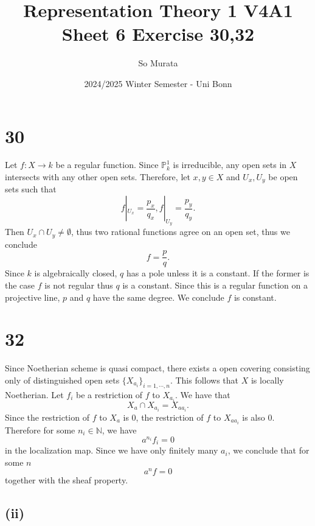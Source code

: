 \documentclass{article}
\title{Representation Theory 1 V4A1 Sheet 6 Exercise 30,32}
\author{So Murata}
\date{2024/2025 Winter Semester - Uni Bonn}
\numberwithin{equation}{section}
\begin{document}
\maketitle

\section*{30}
Let $f:X\to k$ be a regular function. Since $\mathbb{P}^1_k$ is irreducible, any open sets in $X$ intersects with any other open sets. Therefore, let $x,y\in X$ and $U_x,U_y$ be open sets such that
\begin{equation*}
f|_{U_x}={\frac {p_x} {q_x}},f|_{U_y}={\frac {p_y} {q_y}}.
\end{equation*}
Then $U_x\cap U_y\not=\emptyset$, thus two rational functions agree on an open set, thus we conclude
\begin{equation*}
f={\frac p q}.
\end{equation*}
Since $k$ is algebraically closed, $q$ has a pole unless it is a constant. If the former is the case $f$ is not regular thus $q$ is a constant. Since this is a regular function on a projective line, $p$ and $q$ have the same degree. We conclude $f$ is constant.\\

\section*{32}

Since Noetherian scheme is quasi compact, there exists a open covering consisting only of distinguished open sets $\{X_{a_i}\}_{i=1,\cdots,n}$. This follows that $X$ is locally Noetherian. Let $f_i$ be a restriction of $f$ to $X_{a_i}$. We have that 
\begin{equation*}
X_a\cap X_{a_i} = X_{aa_i}.
\end{equation*}
Since the restriction of $f$ to $X_a$ is $0$, the restriction of $f$ to $X_{aa_i}$ is also $0$. Therefore for some $n_i\in\mathbb{N}$, we have
\begin{equation*}
a^{n_i}f_i = 0
\end{equation*}
in the localization map. Since we have only finitely many $a_i$, we conclude that for some $n$
\begin{equation*}
a^nf = 0
\end{equation*}
together with the sheaf property.
\subsection*{(ii)}
\end{document}
